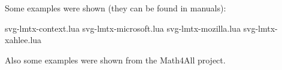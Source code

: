 
\stopbuffer

\typebuffer

\getbuffer

\stoptitle

\starttitle[title=Simple examples]

Some examples were shown (they can be found in manuals):

\starttyping
svg-lmtx-context.lua
svg-lmtx-microsoft.lua
svg-lmtx-mozilla.lua
svg-lmtx-xahlee.lua
\stoptyping

Also some examples were shown from the Math4All project.

\stoptitle

%
%

\stopdocument
